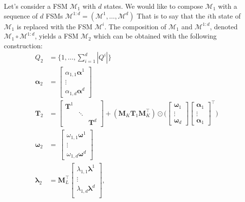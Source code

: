 Let's consider a FSM $\mathcal{M}_1$ with $d$ states. We would like to
compose $\mathcal{M}_1$ with a sequence of $d$ FSMs
$\mathcal{M}^{1:d} = (\mathcal{M}^1, \dots, \mathcal{M}^d)$
That is to say that the $i$th state of $\mathcal{M}_1$ is replaced
with the FSM $\mathcal{M}^i$. The composition of $\mathcal{M}_1$ and
$\mathcal{M}^{1:d}$, denoted $\mathcal{M}_1 \circ \mathcal{M}^{1:d}$,
yields a FSM $\mathcal{M}_2$ which can be obtained with the following
construction:
\begin{align}
    Q_2 &= \{1, \dots, \sum_{i=1}^d |Q^i| \} \\
    \boldsymbol{\alpha}_2 &=
        \begin{bmatrix}
            \alpha_{1,1} \boldsymbol{\alpha}^1 \\
            \vdots \\
            \alpha_{1,d} \boldsymbol{\alpha}^d
        \end{bmatrix} \\
    \mathbf{T}_2 &= \begin{bmatrix}
        \mathbf{T}^1 & & \\
        & \ddots & \\
        & & \mathbf{T}^d
    \end{bmatrix} + (\mathbf{M}_K \mathbf{T}_1 \mathbf{M}_K^\top) \odot
        \Bigg( \begin{bmatrix}
            \boldsymbol{\omega}_1 \\
            \vdots \\
            \boldsymbol{\omega}_d
        \end{bmatrix} \begin{bmatrix}
            \boldsymbol{\alpha}_1\\
            \vdots \\
            \boldsymbol{\alpha}_1
        \end{bmatrix}^\top \Bigg)  \\
    \boldsymbol{\omega}_2 &= \
        \begin{bmatrix}
            \omega_{1,1} \boldsymbol{\omega}^1 \\
            \vdots \\
            \omega_{1,d} \boldsymbol{\omega}^d
        \end{bmatrix} \\
    \boldsymbol{\lambda}_2 &= \mathbf{M}_L^\top \begin{bmatrix}
        \lambda_{1,1} \boldsymbol{\lambda}^1 \\
        \vdots \\
        \lambda_{1,d} \boldsymbol{\lambda}^d \\
    \end{bmatrix},
\end{align}
